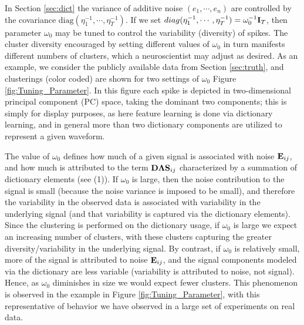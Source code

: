 \documentclass[journal]{IEEEtran}
\begin{document}
In Section \ref{sec:dict} the variance of additive noise $(e_1,\cdots, e_n)$ are controlled by the covariance $\mbox{diag}(\eta_1^{-1},\cdots, \eta_T^{-1})$. If we set $\relax{diag}(\eta_1^{-1},\cdots, \eta_T^{-1})=\omega_0^{-1}{\mathbf I}_T$, then parameter $\omega_0$ may be tuned to control the variability (diversity) of spikes. The cluster diversity encouraged by setting different values of $\omega_0$ in turn manifests different numbers of clusters, which a neuroscientist may adjust as desired. As an example, we consider the publicly available data from Section \ref{sec:truth}, and clusterings (color coded) are shown for two settings of $\omega_0$ Figure \ref{fig:Tuning_Parameter}. In this figure each spike is depicted in two-dimensional principal component (PC) space, taking the dominant two components; this is simply for display purposes, as here feature learning is done via dictionary learning, and in general more than two dictionary components are utilized to represent a given waveform.

The value of $\omega_0$ defines how much of a given signal is associated with noise ${\mathbf E}_{ij}$, and how much is attributed to the term ${\mathbf D}\boldsymbol{\Lambda}{\mathbf S}_{ij}$ characterized by a summation of dictionary elements (see (1)). If $\omega_0$ is large, then the noise contribution to the signal is small (because the noise variance is imposed to be small), and therefore the variability in the observed data is associated with variability in the underlying signal (and that variability is captured via the dictionary elements). Since the clustering is performed on the dictionary usage, if $\omega_0$ is large we expect an increasing number of clusters, with these clusters capturing the greater diversity/variability in the underlying signal. By contrast, if $\omega_0$ is relatively small, more of the signal is attributed to noise ${\mathbf E}_{ij}$, and the signal components modeled via the dictionary are less variable (variability is attributed to noise, not signal). Hence, as $\omega_0$ diminishes in size we would expect fewer clusters. This phenomenon is observed in the example in Figure \ref{fig:Tuning_Parameter}, with this representative of behavior we have observed in a large set of experiments on real data.
\end{document}
